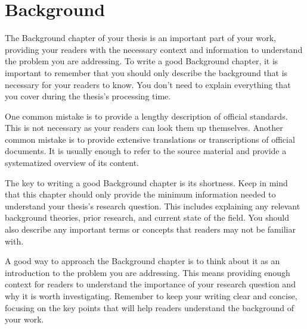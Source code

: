 \chapter{Background} \label{chap:background}

The Background chapter of your thesis is an important part of your work, providing your readers with the necessary context and information to understand the problem you are addressing. To write a good Background chapter, it is important to remember that you should only describe the background that is necessary for your readers to know.
You don't need to explain everything that you cover during the thesis's processing time.

One common mistake is to provide a lengthy description of official standards. This is not necessary as your readers can look them up themselves.
Another common mistake is to provide extensive translations or transcriptions of official documents.
It is usually enough to refer to the source material and provide a systematized overview of its content.

The key to writing a good Background chapter is its shortness. Keep in mind that this chapter should only provide the minimum information needed to understand your thesis's research question.
This includes explaining any relevant background theories, prior research, and current state of the field.
You should also describe any important terms or concepts that readers may not be familiar with.

A good way to approach the Background chapter is to think about it as an introduction to the problem you are addressing. This means providing enough context for readers to understand the importance of your research question and why it is worth investigating.
Remember to keep your writing clear and concise, focusing on the key points that will help readers understand the background of your work.